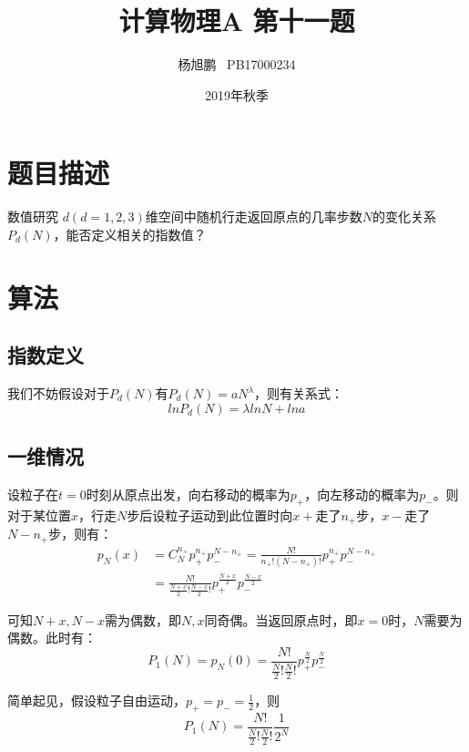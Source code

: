 \documentclass[a4paper,11pt]{article}
\author{ 杨旭鹏  \  PB17000234}
\date{2019年秋季}
\title{计算物理A 第十一题}
\begin{document}
\maketitle
\tableofcontents

\section{题目描述}
数值研究 $d(d=1, 2, 3)$维空间中随机行走返回原点的几率步数$N$的变化关系 $P_{d}(N)$，能否定义相关的指数值？

\section{算法}

\subsection{指数定义}
我们不妨假设对于$P_{d}(N)$有$P_{d}(N) = a N^{\lambda}$，则有关系式：
\begin{equation}
	ln P_{d}(N) = \lambda ln N + ln a
\end{equation}


\subsection{一维情况}
设粒子在$t = 0$时刻从原点出发，向右移动的概率为$p_{+}$，向左移动的概率为$p_{-}$。则对于某位置$x$，行走$N$步后设粒子运动到此位置时向$x+$走了$n_{+}$步，$x-$走了$N-n_{+}$步，则有：
\begin{equation}
\begin{aligned}
	p_{N}(x) &= C_{N}^{n_{+}}p_{+}^{n_{+}}p_{-}^{N-n_{+}}  = \frac{N!}{n_{+}!(N-n_{+})!}p_{+}^{n_{+}}p_{-}^{N-n_{+}} \\
	&=  \frac{N!}{\frac{N+x}{2} !\frac{N-x}{2} !} p_{+}^{\frac{N+x}{2}}p_{-}^{\frac{N-x}{2}}
\end{aligned}
\end{equation}

可知$N+x,N-x$需为偶数，即$N,x$同奇偶。当返回原点时，即$x=0$时，$N$需要为偶数。此时有：
\begin{equation}
	P_{1}(N) = p_{N}(0) = \frac{N!}{\frac{N}{2}!\frac{N}{2}!}p_{+}^{\frac{N}{2}}p_{-}^{\frac{N}{2}}
\end{equation}

简单起见，假设粒子自由运动，$p_{+} = p_{-} = \frac{1}{2}$，则
\begin{equation}
	P_{1}(N) =   \frac{N!}{\frac{N}{2}!\frac{N}{2}!}\frac{1}{2^{N}}
\end{equation}
\end{document}
